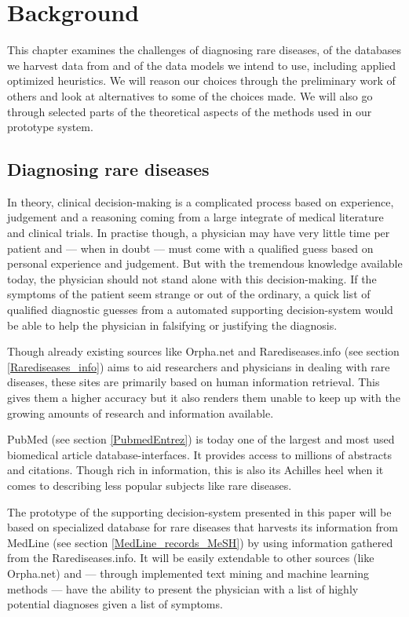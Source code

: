 \chapter{Background\label{Background}}

This chapter examines the challenges of diagnosing rare diseases, of
the databases we harvest data from and of the data models we intend to
use, including applied optimized heuristics. We will reason our
choices through the preliminary work of others and look at
alternatives to some of the choices made. We will also go through
selected parts of the theoretical aspects of the methods used in our prototype
system.

\section{Diagnosing rare diseases}

In theory, clinical decision-making is a complicated process based on
experience, judgement and a reasoning coming from a large integrate of
medical literature and clinical trials. In practise though, a
physician may have very little time per patient and --- when in doubt
--- must come with a qualified guess based on personal experience and
judgement. But with the tremendous knowledge available today, the
physician should not stand alone with this decision-making. If the
symptoms of the patient seem strange or out of the ordinary, a quick
list of qualified diagnostic guesses from a automated supporting
decision-system would be able to help the physician in falsifying or
justifying the diagnosis.

Though already existing sources like Orpha.net and
Rarediseases.info (see section \ref{Rarediseases_info}) aims to aid researchers and
physicians in dealing with rare diseases, these sites are primarily
based on human information retrieval. This gives them a higher
accuracy but it also renders them unable to keep up with the growing
amounts of research and information available.

PubMed (see section \ref{PubmedEntrez}) is today one of the largest and most used
biomedical article database-interfaces. It provides access to millions
of abstracts and citations. Though rich in information, this is
also its Achilles heel when it comes to describing less popular
subjects like rare diseases.

The prototype of the supporting decision-system presented in this
paper will be based on specialized database for rare diseases that
harvests its information from MedLine (see section
\ref{MedLine_records_MeSH}) by using information gathered from the
Rarediseases.info. It will be easily extendable to other sources (like
Orpha.net) and --- through implemented text mining and machine
learning methods --- have the ability to present the physician with a
list of highly potential diagnoses given a list of symptoms.

